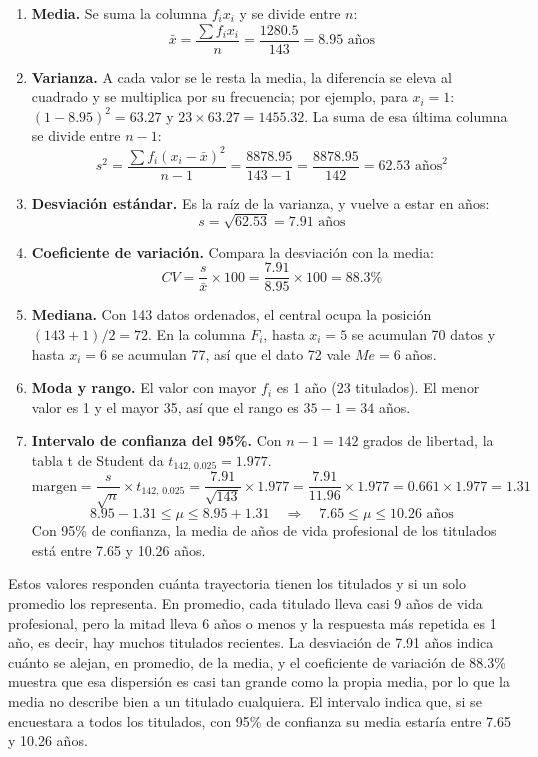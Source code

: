 \documentclass[12pt, a4paper]{article}
\begin{document}
\begin{enumerate}
  \item \textbf{Media.} Se suma la columna $f_i x_i$ y se divide entre
  $n$:
  \[
  \bar{x} = \frac{\sum f_i x_i}{n} = \frac{1280.5}{143} = 8.95 \text{ años}
  \]
  \item \textbf{Varianza.} A cada valor se le resta la media, la
  diferencia se eleva al cuadrado y se multiplica por su frecuencia; por
  ejemplo, para $x_i = 1$: $(1 - 8.95)^2 = 63.27$ y $23 \times 63.27 =
  1455.32$. La suma de esa última columna se divide entre $n - 1$:
  \[
  s^2 = \frac{\sum f_i (x_i - \bar{x})^2}{n-1} = \frac{8878.95}{143 - 1}
  = \frac{8878.95}{142} = 62.53 \text{ años}^2
  \]
  \item \textbf{Desviación estándar.} Es la raíz de la varianza, y vuelve
  a estar en años:
  \[
  s = \sqrt{62.53} = 7.91 \text{ años}
  \]
  \item \textbf{Coeficiente de variación.} Compara la desviación con la
  media:
  \[
  CV = \frac{s}{\bar{x}} \times 100 = \frac{7.91}{8.95} \times 100 =
  88.3\%
  \]
  \item \textbf{Mediana.} Con 143 datos ordenados, el central ocupa la
  posición $(143+1)/2 = 72$. En la columna $F_i$, hasta $x_i = 5$ se
  acumulan 70 datos y hasta $x_i = 6$ se acumulan 77, así que el dato 72
  vale $Me = 6$ años.
  \item \textbf{Moda y rango.} El valor con mayor $f_i$ es 1 año (23
  titulados). El menor valor es 1 y el mayor 35, así que el rango es
  $35 - 1 = 34$ años.
  \item \textbf{Intervalo de confianza del 95\%.} Con $n - 1 = 142$
  grados de libertad, la tabla t de Student da $t_{142,\,0.025} = 1.977$.
  \[
  \text{margen} = \frac{s}{\sqrt{n}} \times t_{142,\,0.025} =
  \frac{7.91}{\sqrt{143}} \times 1.977 = \frac{7.91}{11.96} \times 1.977
  = 0.661 \times 1.977 = 1.31
  \]
  \[
  8.95 - 1.31 \le \mu \le 8.95 + 1.31 \quad\Rightarrow\quad 7.65 \le \mu
  \le 10.26 \text{ años}
  \]
  Con 95\% de confianza, la media de años de vida profesional de los
  titulados está entre 7.65 y 10.26 años.
\end{enumerate}

Estos valores responden cuánta trayectoria tienen los titulados y si un
solo promedio los representa. En promedio, cada titulado lleva casi 9
años de vida profesional, pero la mitad lleva 6 años o menos y la
respuesta más repetida es 1 año, es decir, hay muchos titulados
recientes. La desviación de 7.91 años indica cuánto se alejan, en
promedio, de la media, y el coeficiente de variación de 88.3\% muestra que
esa dispersión es casi tan grande como la propia media, por lo que la
media no describe bien a un titulado cualquiera. El intervalo indica que,
si se encuestara a todos los titulados, con 95\% de confianza su media
estaría entre 7.65 y 10.26 años.
\end{document}
